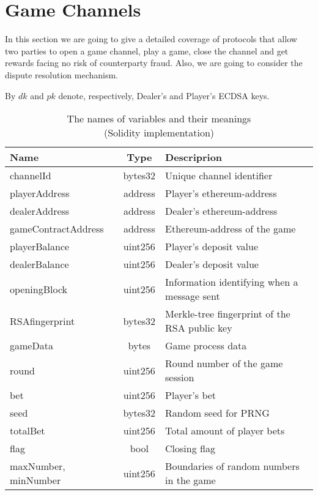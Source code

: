 \section{Game Channels} \label{gamechannel}
In this section we are going to give a detailed coverage of protocols that allow two parties to open a game channel, play a game, close the channel and get rewards facing no risk of counterparty fraud. Also, we are going to consider the dispute resolution mechanism.

By $dk$ and $pk$ denote, respectively, Dealer's and Player's ECDSA keys. 

\begin{table}[h]

\caption{The names of variables and their meanings \\ (Solidity implementation)}
\begin{tabular}{|l|c|l|}
\hline
Name&Type&Descriprion\\
\hline
channelId & bytes32 & Unique channel identifier\\ 

playerAddress & address & Player's ethereum-address\\            
dealerAddress & address & Dealer's ethereum-address\\  
gameContractAddress & address & Ethereum-address of the game\\             
playerBalance & uint256 & Player's deposit value\\                   
dealerBalance & uint256 & Dealer's deposit value\\                   
openingBlock & uint256 &  Information identifying when a message sent\\                  
RSAfingerprint & bytes32 &  Merkle-tree fingerprint of the RSA public key\\  
gameData & bytes & Game process data\\
round & uint256 & Round number of the game session \\
bet & uint256 & Player's bet \\
seed & bytes32 & Random seed for PRNG\\
totalBet & uint256 & Total amount of  player bets \\
flag & bool &Closing flag \\
maxNumber, minNumber & uint256 & Boundaries of random numbers in the game\\
\hline
\end{tabular}
\end{table}

